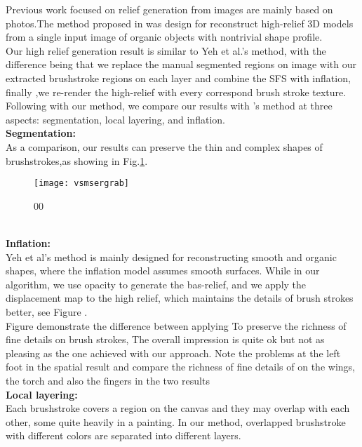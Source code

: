 Previous work focused on relief generation from images are mainly based on photos.The method proposed in \cite{yeh2017interactive} was design for reconstruct high-relief 3D models from a single input image of organic objects with nontrivial shape profile. \\
Our high relief generation result is similar to Yeh et al.'s method, with the difference being that we replace the manual segmented regions on image with our extracted brushstroke regions on each layer and combine the SFS with inflation, finally ,we re-render the high-relief with every correspond brush stroke texture. \\
Following with our method, we compare our results with  \cite{yeh2017interactive}'s method at three aspects: segmentation, local layering, and inflation.\\
\textbf{Segmentation:} \\
As a comparison, our results can preserve the thin and complex shapes of brushstrokes,as showing in Fig.\ref{fig:vsmsergrab}. \\ 
\begin{figure}[h]
	\centering %
	\texttt{[image: vsmsergrab]}
	\caption{00 }
	\label{fig:vsmsergrab}
\end{figure}\\
\textbf{Inflation: }\\
Yeh et al's method is mainly designed for reconstructing smooth and organic shapes, where the inflation model assumes smooth surfaces.
While in our algorithm, we use opacity to generate the bas-relief, and we apply the displacement map to the high relief, which maintains the details of brush strokes better, see Figure .\\
Figure  demonstrate the difference between applying 
To preserve the richness of fine details on brush strokes,    
The overall impression is quite ok but not as pleasing as the one achieved with our approach.
Note the problems at the left foot in the spatial result and compare the richness of fine details of on the wings, the torch and also the fingers in the two results\\
\textbf{Local layering:} \\
Each brushstroke covers a region on the canvas and they may overlap with each other, some quite heavily in a painting. In our method, overlapped brushstroke with different colors are separated into different layers. 

